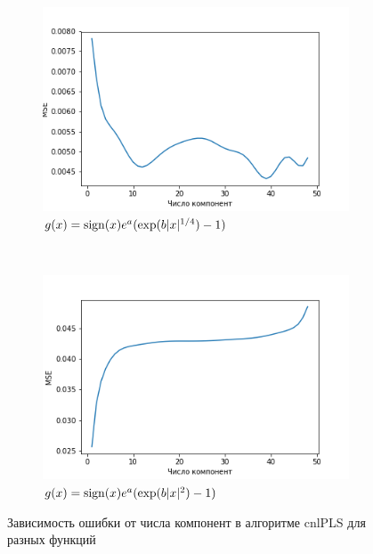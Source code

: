 \documentclass[12pt,fleqn,unicode]{article}
\begin{document}
\begin{figure}
    \begin{subfigure}[b]{0.4\textwidth}
        \includegraphics[width=\textwidth]{exp_x_1_4.png}
        \caption{$g(x) = \mathop{\rm sign}\limits(x)e^a(\exp(b|x|^{1/4}) - 1)$}
        \label{fig:exp_x_1_4}
    \end{subfigure}
    ~ %
    \begin{subfigure}[b]{0.4\textwidth}
        \includegraphics[width=\textwidth]{exp_x_2.png}
        \caption{$g(x) = \mathop{\rm sign}\limits(x)e^a(\exp(b|x|^{2}) - 1)$}
        \label{fig:exp_x_2}
    \end{subfigure}
    \caption{Зависимость ошибки от числа компонент в алгоритме cnlPLS для разных функций}\label{fig:animals}
\end{figure}
\end{document}

